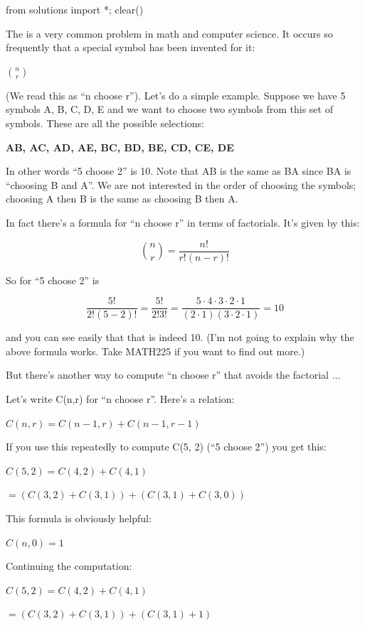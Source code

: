 \begin{python0}
from solutions import *; clear()
\end{python0}

The  is a very common
problem in math and computer science. It occurs so frequently that a
special symbol has been invented for it:

$\binom{n}{r}$

(We read this as ``n choose r''). Let's do a simple
example. Suppose we have 5 symbols A, B, C, D, E and we want to choose
two symbols from this set of symbols. These are all the possible
selections:

\textbf{AB, AC, AD, AE, BC, BD, BE, CD, CE, DE}

In other words ``5 choose 2'' is 10. Note that AB is the same as BA
since BA is ``choosing B and A''. We are not interested in the order of
choosing the symbols; choosing A then B is the same as choosing B then
A.

In fact there's a formula for ``n choose r'' in terms of
factorials. It's given by this:

\[
\binom{n}{r} = \frac{n!}{r!(n-r)!}
\]

So for ``5 choose 2'' is

\[
\frac{5!}{2!(5-2)!} = \frac{5!}{2!3!} = \frac{5 \cdot 4 \cdot 3 \cdot 2 \cdot 1}{(2 \cdot 1)(3 \cdot 2 \cdot 1)} = 10
\]

and you can see easily that that is indeed 10. (I'm not
going to explain why the above formula works. Take MATH225 if you want
to find out more.)

But there's another way to compute ``n choose r'' that
avoids the factorial ...

Let's write C(n,r) for ``n choose r''.
Here's a relation:

$C(n, r) = C(n - 1, r) + C(n - 1, r - 1)$

If you use this repeatedly to compute C(5, 2) (``5 choose 2'') you get
this:

$C(5, 2) = C(4, 2) + C(4, 1)$

$= (C(3, 2) + C(3, 1)) + (C(3, 1) + C(3, 0))$

This formula is obviously helpful:

$C(n, 0) = 1$

Continuing the computation:

$C(5, 2) = C(4, 2) + C(4, 1)$

$= (C(3, 2) + C(3, 1)) + (C(3, 1) + 1)$

